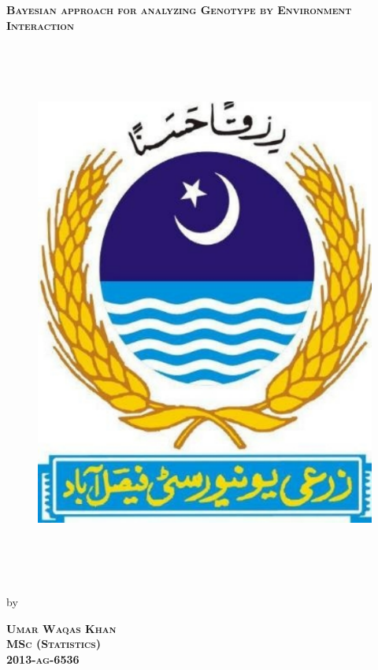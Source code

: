 \begin{titlepage}
\begin{center}

\LARGE{\textbf{\textsc{%
	Bayesian approach for analyzing Genotype by Environment Interaction
	}}}

\begin{figure}[H]
\centering 
 \scalebox{0.3}
 {\includegraphics[width=17cm, height=18cm]{01ThesisFront/LogoUAF.pdf}}
\end{figure}


\vspace*{0.1cm}

\normalsize

by

\textbf{\textsc{%
 Umar Waqas Khan\\
 MSc (Statistics)\\
 2013-ag-6536 %
 }}
	


\end{center}
\end{titlepage}
